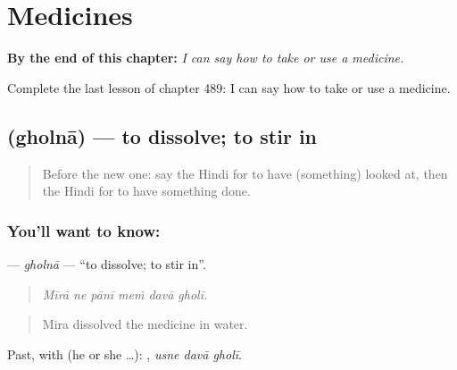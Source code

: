 
\chapter{Medicines}
\label{ch:hi-medicines}

\begin{chapteropening}
\textbf{By the end of this chapter:} \emph{I can say how to take or use a medicine.}

Complete the last lesson of chapter 489: I can say how to take or use a medicine.
\end{chapteropening}

\section[\texorpdfstring{\hi{घोलना} (gholnā)}{घोलना (gholnā)}]{ (gholnā) — to dissolve; to stir in}

\label{lesson:HI-C489-gholna}



\begin{quote}
Before the new one: say the Hindi for to have (something) looked at, then the Hindi for to have something done.
\end{quote}

\subsection*{You'll want to know: }
\textbf{} — \emph{gholnā} — \textquotedblleft{}to dissolve; to stir in\textquotedblright{}.

\begin{quote}
     
\end{quote}

\begin{quote}
\emph{Mīrā ne pānī meṁ davā gholī.}
\end{quote}

\begin{quote}
Mira dissolved the medicine in water.
\end{quote}

Past, with  (he or she …):   , \emph{usne davā gholī}.

